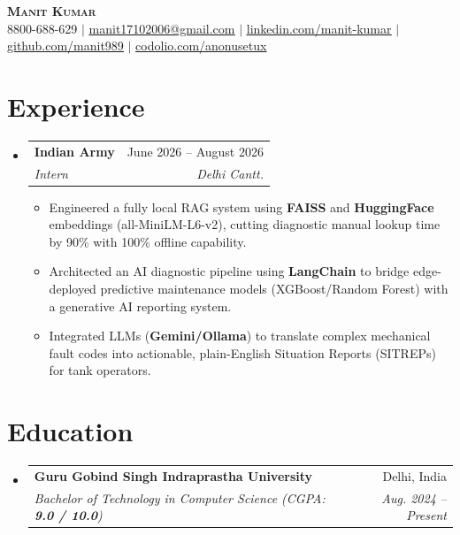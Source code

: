 \documentclass[letterpaper,11pt]{article}
\makeatletter
\newcommand{\resumeItem}[1]{
  \item\small{
    {#1 \vspace{-3pt}}
  }
}
\newcommand{\resumeSubheading}[4]{
  \vspace{-2pt}\item
    \begin{tabular*}{0.97\textwidth}[t]{l@{\extracolsep{\fill}}r}
      \textbf{#1} & #2 \\
      \textit{\small#3} & \textit{\small #4} \\
    \end{tabular*}\vspace{-7pt}
}
\newcommand{\resumeSubHeadingListStart}{\begin{itemize}[leftmargin=0.15in, label={}]}
\newcommand{\resumeSubHeadingListEnd}{\end{itemize}}
\newcommand{\resumeItemListStart}{\begin{itemize}}
\newcommand{\resumeItemListEnd}{\end{itemize}\vspace{-6pt}}
\makeatother
\begin{document}
\begin{center}
	\textbf{\Huge \scshape Manit Kumar} \\ \vspace{1pt}
	\small 8800-688-629 $|$ \href{mailto:manit17102006@gmail.com}{\underline{manit17102006@gmail.com}} $|$
	\href{https://www.linkedin.com/in/manit-kumar-a0a725325/}{\underline{linkedin.com/manit-kumar}} $|$
	\href{https://github.com/manit989}{\underline{github.com/manit989}} $|$
	\href{https://codolio.com/profile/anonusetux}{\underline{codolio.com/anonusetux}}
\end{center}
\vspace{-10pt}

\section{Experience}
\resumeSubHeadingListStart

\resumeSubheading
{Indian Army}{June 2026 -- August 2026}
{Intern}{Delhi Cantt.}
\resumeItemListStart
\resumeItem{Engineered a fully local RAG system using \textbf{FAISS} and \textbf{HuggingFace} embeddings (all-MiniLM-L6-v2), cutting diagnostic manual lookup time by 90\% with 100\% offline capability.}
\resumeItem{Architected an AI diagnostic pipeline using \textbf{LangChain} to bridge edge-deployed predictive maintenance models (XGBoost/Random Forest) with a generative AI reporting system.}
\resumeItem{Integrated LLMs (\textbf{Gemini/Ollama}) to translate complex mechanical fault codes into actionable, plain-English Situation Reports (SITREPs) for tank operators.}
\resumeItemListEnd

\resumeSubHeadingListEnd
\vspace{-14pt}

\section{Education}
\resumeSubHeadingListStart
\resumeSubheading
{Guru Gobind Singh Indraprastha University}{Delhi, India}
{Bachelor of Technology in Computer Science (CGPA: \textbf{9.0 / 10.0})}{Aug. 2024 -- Present}
\resumeSubHeadingListEnd
\vspace{-14pt}

\end{document}
